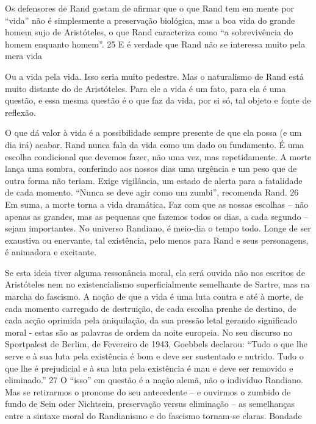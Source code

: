  \par 
Os defensores de Rand gostam de afirmar que o que Rand tem em mente por “vida” não é simplesmente a preservação biológica, mas a boa vida do grande homem sujo de Aristóteles, o que Rand caracteriza como “a sobrevivência do homem enquanto homem”. {\color{blue}25} E é verdade que Rand não se interessa muito pela mera vida
 \par 
Ou a vida pela vida. Isso seria muito pedestre. Mas o naturalismo de Rand está muito distante do de Aristóteles. Para ele a vida é um fato, para ela é uma questão, e essa mesma questão é o que faz da vida, por si só, tal objeto e fonte de reflexão.
 \par 
O que dá valor à vida é a possibilidade sempre presente de que ela possa (e um dia irá) acabar. Rand nunca fala da vida como um dado ou fundamento. É uma escolha condicional que devemos fazer, não uma vez, mas repetidamente. A morte lança uma sombra, conferindo aos nossos dias uma urgência e um peso que de outra forma não teriam. Exige vigilância, um estado de alerta para a fatalidade de cada momento. “Nunca se deve agir como um zumbi”, recomenda Rand. {\color{blue}26} Em suma, a morte torna a vida dramática. Faz com que as nossas escolhas – não apenas as grandes, mas as pequenas que fazemos todos os dias, a cada segundo – sejam importantes. No universo Randiano, é meio-dia o tempo todo. Longe de ser exaustiva ou enervante, tal existência, pelo menos para Rand e seus personagens, é animadora e excitante.
 \par 
Se esta ideia tiver alguma ressonância moral, ela será ouvida não nos escritos de Aristóteles nem no existencialismo superficialmente semelhante de Sartre, mas na marcha do fascismo. A noção de que a vida é uma luta contra e até à morte, de cada momento carregado de destruição, de cada escolha prenhe de destino, de cada acção oprimida pela aniquilação, da sua pressão letal gerando significado moral - estas são as palavras de ordem da noite europeia. No seu discurso no Sportpalest de Berlim, de Fevereiro de 1943, Goebbels declarou: “Tudo o que lhe serve e à sua luta pela existência é bom e deve ser sustentado e nutrido. Tudo o que lhe é prejudicial e à sua luta pela existência é mau e deve ser removido e eliminado.” {\color{blue}27} O “isso” em questão é a nação alemã, não o indivíduo Randiano. Mas se retirarmos o pronome do seu antecedente – e ouvirmos o zumbido de fundo de Sein oder Nichtsein, preservação versus eliminação – as semelhanças entre a sintaxe moral do Randianismo e do fascismo tornam-se claras. Bondade
